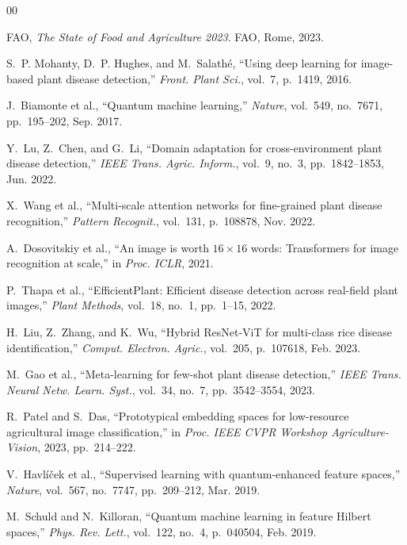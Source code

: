 \documentclass[conference]{IEEEtran}
\begin{document}
\begin{thebibliography}{00}

FAO, \textit{The State of Food and Agriculture 2023}. FAO, Rome, 2023.

S.~P. Mohanty, D.~P. Hughes, and M.~Salath\'{e}, ``Using deep learning for image-based plant disease detection,'' \textit{Front. Plant Sci.}, vol.~7, p.~1419, 2016.

J.~Biamonte et al., ``Quantum machine learning,'' \textit{Nature}, vol.~549, no.~7671, pp.~195--202, Sep. 2017.

Y.~Lu, Z.~Chen, and G.~Li, ``Domain adaptation for cross-environment plant disease detection,'' \textit{IEEE Trans. Agric. Inform.}, vol.~9, no.~3, pp.~1842--1853, Jun. 2022.

X.~Wang et al., ``Multi-scale attention networks for fine-grained plant disease recognition,'' \textit{Pattern Recognit.}, vol.~131, p.~108878, Nov. 2022.

A.~Dosovitskiy et al., ``An image is worth $16\times16$ words: Transformers for image recognition at scale,'' in \textit{Proc. ICLR}, 2021.

P.~Thapa et al., ``EfficientPlant: Efficient disease detection across real-field plant images,'' \textit{Plant Methods}, vol.~18, no.~1, pp.~1--15, 2022.

H.~Liu, Z.~Zhang, and K.~Wu, ``Hybrid ResNet-ViT for multi-class rice disease identification,'' \textit{Comput. Electron. Agric.}, vol.~205, p.~107618, Feb. 2023.

M.~Gao et al., ``Meta-learning for few-shot plant disease detection,'' \textit{IEEE Trans. Neural Netw. Learn. Syst.}, vol.~34, no.~7, pp.~3542--3554, 2023.

R.~Patel and S.~Das, ``Prototypical embedding spaces for low-resource agricultural image classification,'' in \textit{Proc. IEEE CVPR Workshop Agriculture-Vision}, 2023, pp.~214--222.

V.~Havl\'{i}\v{c}ek et al., ``Supervised learning with quantum-enhanced feature spaces,'' \textit{Nature}, vol.~567, no.~7747, pp.~209--212, Mar. 2019.

M.~Schuld and N.~Killoran, ``Quantum machine learning in feature Hilbert spaces,'' \textit{Phys. Rev. Lett.}, vol.~122, no.~4, p.~040504, Feb. 2019.


\end{thebibliography}
\end{document}
